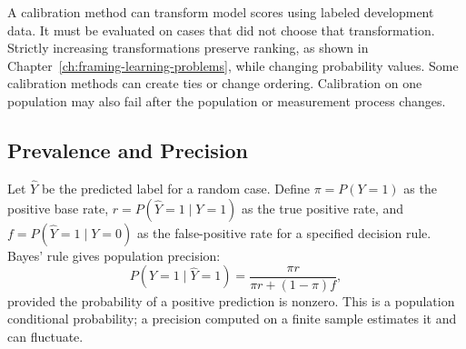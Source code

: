 \par\addvspace{\intextsep}\noindent\begin{minipage}{\linewidth}
\centering
{}
\label{fig:reliability-diagram}
\end{minipage}\par\addvspace{\intextsep}

A calibration method can transform model scores using labeled development data. It must be evaluated on cases that did not choose that transformation. Strictly increasing transformations preserve ranking, as shown in Chapter~\ref{ch:framing-learning-problems}, while changing probability values. Some calibration methods can create ties or change ordering. Calibration on one population may also fail after the population or measurement process changes.

\subsection{Prevalence and Precision}

Let $\hat Y$ be the predicted label for a random case. Define $\pi=P(Y=1)$ as the positive base rate, $r=P(\hat Y=1\mid Y=1)$ as the true positive rate, and $f=P(\hat Y=1\mid Y=0)$ as the false-positive rate for a specified decision rule. Bayes' rule gives population precision:
\[
P(Y=1\mid\hat Y=1)=
\frac{\pi r}{\pi r+(1-\pi)f},
\]
provided the probability of a positive prediction is nonzero. This is a population conditional probability; a precision computed on a finite sample estimates it and can fluctuate.


